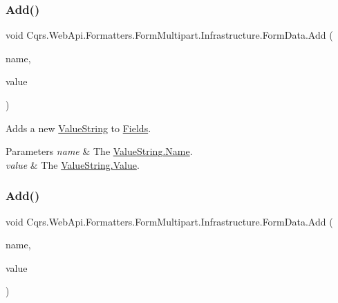 \subsubsection{\texorpdfstring{Add()}{Add()}\hspace{0.1cm}{\footnotesize\ttfamily [1/2]}}
{\footnotesize\ttfamily void Cqrs.\+Web\+Api.\+Formatters.\+Form\+Multipart.\+Infrastructure.\+Form\+Data.\+Add (\begin{DoxyParamCaption}\item[{string}]{name,  }\item[{string}]{value }\end{DoxyParamCaption})}



Adds a new \hyperlink{classCqrs_1_1WebApi_1_1Formatters_1_1FormMultipart_1_1Infrastructure_1_1FormData_1_1ValueString}{Value\+String} to \hyperlink{classCqrs_1_1WebApi_1_1Formatters_1_1FormMultipart_1_1Infrastructure_1_1FormData_a91cfdcbb3a074aadee7e7fc228c04a6a_a91cfdcbb3a074aadee7e7fc228c04a6a}{Fields}. 


\begin{DoxyParams}{Parameters}
{\em name} & The \hyperlink{classCqrs_1_1WebApi_1_1Formatters_1_1FormMultipart_1_1Infrastructure_1_1FormData_1_1ValueString_a75a080b90171a612155590a997076016_a75a080b90171a612155590a997076016}{Value\+String.\+Name}.\\
\hline
{\em value} & The \hyperlink{classCqrs_1_1WebApi_1_1Formatters_1_1FormMultipart_1_1Infrastructure_1_1FormData_1_1ValueString_a2e4eb245c5d5148672d233903f2dfcd1_a2e4eb245c5d5148672d233903f2dfcd1}{Value\+String.\+Value}.\\
\hline
\end{DoxyParams}
\mbox{\label{classCqrs_1_1WebApi_1_1Formatters_1_1FormMultipart_1_1Infrastructure_1_1FormData_a11d2a07d1ba691b35ee3b3e553c040ba_a11d2a07d1ba691b35ee3b3e553c040ba}} 
\subsubsection{\texorpdfstring{Add()}{Add()}\hspace{0.1cm}{\footnotesize\ttfamily [2/2]}}
{\footnotesize\ttfamily void Cqrs.\+Web\+Api.\+Formatters.\+Form\+Multipart.\+Infrastructure.\+Form\+Data.\+Add (\begin{DoxyParamCaption}\item[{string}]{name,  }\item[{\hyperlink{classCqrs_1_1WebApi_1_1Formatters_1_1FormMultipart_1_1Infrastructure_1_1HttpFile}{Http\+File}}]{value }\end{DoxyParamCaption})}



